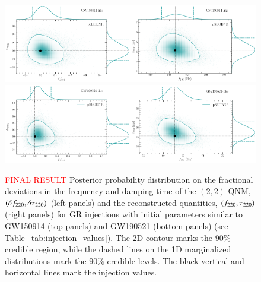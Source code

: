 \begin{figure}[hbt]
\begin{center}
        \includegraphics[width=0.5\textwidth]{figures/GW150914_simulated_signal_0p0_deltaf220_deltatau220.png}\includegraphics[width=0.5\textwidth]{figures/GW150914_simulated_signal_0p0_f220_tau220.png}
        \includegraphics[width=0.5\textwidth]{figures/GW190521_simulated_signal_0p0_deltaf220_deltatau220.png}\includegraphics[width=0.5\textwidth]{figures/GW190521_simulated_signal_0p0_f220_tau220.png}
        \caption{\textcolor{red}{FINAL RESULT} Posterior probability
          distribution on the fractional deviations in the frequency
          and damping time of the $(2,2)$ QNM, $(\delta f_{\text{220}},\delta \tau_{\text{220}})$
          (left panels) and the reconstructed quantities,
          $(f_{\text{220}}, \tau_{\text{220}})$ (right panels) for GR
          injections \ab{($\SEOB$)} with initial parameters similar to GW150914 (top
          panels) and GW190521 (bottom panels)
          (see Table~\ref{tab:injection_values}). The 2D contour marks the
          90\% credible region, while the dashed lines on the 1D
          marginalized distributions mark the 90\% credible
          levels. The black vertical and horizontal lines mark the
          injection values.}
        \label{fig:simulated_signal_GR}
\end{center}
\end{figure}
